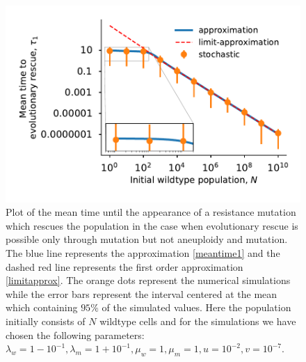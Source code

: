 \documentclass[12pt]{extarticle}
\begin{document}
\begin{figure}[p]
 \vspace*{1\baselineskip}
\includegraphics[width=1\textwidth]{Figures/MeanTimeGrowthMutantDirectPlot.pdf}
\caption{Plot of the mean time until the appearance of a resistance mutation which rescues the population in the case when evolutionary rescue is possible only through mutation but not aneuploidy and mutation.  The blue line represents the approximation \eqref{meantime1} and the dashed red line represents the first order approximation \eqref{limitapprox}. The orange dots represent the numerical simulations while the error bars represent the interval centered at the mean which containing $95\%$ of the simulated values. Here the population initially consists of $N$ wildtype cells and for the simulations we have chosen the following parameters: $\lambda_w=1-10^{-1},\lambda_m=1+10^{-1},\mu_w=1,\mu_m=1,u=10^{-2},v=10^{-7}$.}
\label{MeanTimeGrowthAneuploidyPlot}
\end{figure}
\end{document}
